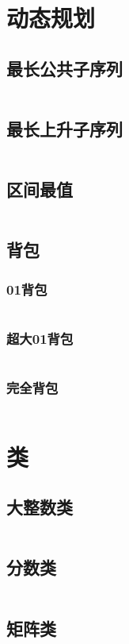 \documentclass[a4paper,6pt]{article}
\begin{document}
\newpage
\section{动态规划}
\subsection{最长公共子序列}
\inputminted[breaklines]{c++}{dynamic-programming/LCS.cpp}
\subsection{最长上升子序列}
\inputminted[breaklines]{c++}{dynamic-programming/LIS-nlogn.cpp}
\subsection{区间最值}
\inputminted[breaklines]{c++}{dynamic-programming/RMQ.cpp}
\subsection{背包}
\subsubsection{01背包}
\inputminted[breaklines]{c++}{dynamic-programming/bags/01.cpp}
\subsubsection{超大01背包}
\inputminted[breaklines]{c++}{dynamic-programming/bags/big-01.cpp}
\subsubsection{完全背包}
\inputminted[breaklines]{c++}{dynamic-programming/bags/complete.cpp}

\newpage
\section{类}
\subsection{大整数类}
\inputminted[breaklines]{c++}{class/BigInt.cpp}
\subsection{分数类}
\inputminted[breaklines]{c++}{class/Frac.cpp}
\subsection{矩阵类}
\inputminted[breaklines]{c++}{class/Matrix.cpp}
\end{document}
